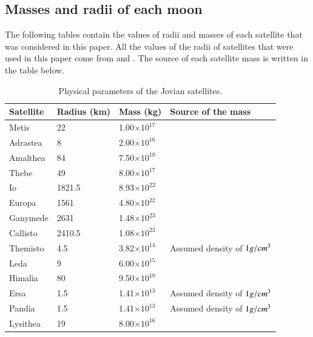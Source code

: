 \documentclass{aa}
\begin{document}
\begin{appendix}
    \section{Masses and radii of each moon}\label{App:mass_radii}
    The following tables contain the values of radii and masses of each satellite that was considered in this paper. All the values of the radii of satellites that were used in this paper come from \cite{Sheppard_JupiterMoons_website} and \cite{Sheppard_SaturnMoons_website}. The source of each satellite mass is written in the table below.
    \begin{table}[!ht]
        \caption{Physical parameters of the Jovian satellites.}
    \centering
        \small                
\setlength{\tabcolsep}{4pt} 
    \begin{tabular}{llll}
        Satellite & Radius (km) & Mass (kg) & Source of the mass \\ \hline
        Metis & 22 & 1.00$\times 10^{17 }$ & \cite{Williams_NSSDCA_JovianFact} \\ 
        Adrastea & 8 & 2.00$\times 10^{16 }$ & \cite{Williams_NSSDCA_JovianFact} \\ 
        Amalthea & 84 & 7.50$\times 10^{18 }$ & \cite{Williams_NSSDCA_JovianFact} \\ 
        Thebe & 49 & 8.00$\times 10^{17 }$ & \cite{Williams_NSSDCA_JovianFact} \\ 
        Io & 1821.5 & 8.93$\times 10^{22 }$ & \cite{Williams_NSSDCA_JovianFact} \\ 
        Europa & 1561 & 4.80$\times 10^{22 }$ & \cite{Williams_NSSDCA_JovianFact} \\ 
        Ganymede & 2631 & 1.48$\times 10^{23 }$ & \cite{Williams_NSSDCA_JovianFact} \\ 
        Callisto & 2410.5 & 1.08$\times 10^{23 }$ & \cite{Williams_NSSDCA_JovianFact} \\ 
        Themisto & 4.5 & 3.82$\times 10^{14 }$ & Assumed density of $1\space g/cm^3$ \\ 
        Leda & 9 & 6.00$\times 10^{15 }$ & \cite{Williams_NSSDCA_JovianFact} \\ 
        Himalia & 80 & 9.50$\times 10^{18 }$ & \cite{Williams_NSSDCA_JovianFact} \\ 
        Ersa & 1.5 & 1.41$\times 10^{13 }$ & Assumed density of $1 \space g/cm^3$ \\ 
        Pandia & 1.5 & 1.41$\times 10^{13 }$ & Assumed density of $1 \space g/cm^3$ \\ 
        Lysithea & 19 & 8.00$\times 10^{16 }$ & \cite{Williams_NSSDCA_JovianFact} \\ 

\end{tabular}
\end{table}
\end{appendix}
\end{document}

